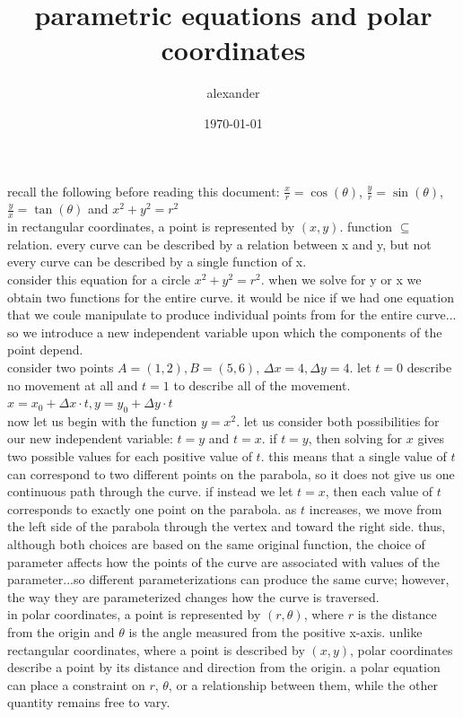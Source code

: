\documentclass{article}
\author{alexander}
\date{\today}
\title{parametric equations and polar coordinates}
\begin{document}
\maketitle



recall the following before reading this document: $\frac{x}{r} = \cos(\theta)$, $\frac{y}{r} = \sin(\theta)$, $\frac{y}{x} = \tan(\theta)$ and $x^2 + y^2 = r^2$\\

in rectangular coordinates, a point is represented by $(x, y)$. function $\subseteq$ relation. every curve can be described by a relation between x and y, but not every curve can be described by a single function of x.\\

consider this equation for a circle $x^2 + y^2 = r^2$. when we solve for y or x we obtain two functions for the entire curve. it would be nice if we had one equation that we coule manipulate to produce individual points from for the entire curve... so we introduce a new independent variable upon which the components of the point depend.\\

consider two points $A = (1, 2), B = (5, 6)$, $\Delta x = 4, \Delta y = 4$. let $t=0$ describe no movement at all and $t=1$ to describe all of the movement. $x = x_0 + \Delta x \cdot t, y = y_0 + \Delta y \cdot t$\\

now let us begin with the function $y = x^2$. let us consider both possibilities for our new independent variable: $t = y$ and $t = x$. if $t = y$, then solving for $x$ gives two possible values for each positive value of $t$. this means that a single value of $t$ can correspond to two different points on the parabola, so it does not give us one continuous path through the curve. if instead we let $t = x$, then each value of $t$ corresponds to exactly one point on the parabola. as $t$ increases, we move from the left side of the parabola through the vertex and toward the right side. thus, although both choices are based on the same original function, the choice of parameter affects how the points of the curve are associated with values of the parameter...so different parameterizations can produce the same curve; however, the way they are parameterized changes how the curve is traversed.\\

in polar coordinates, a point is represented by $(r,\theta)$, where $r$ is the distance from the origin and $\theta$ is the angle measured from the positive x-axis. unlike rectangular coordinates, where a point is described by $(x,y)$, polar coordinates describe a point by its distance and direction from the origin. a polar equation can place a constraint on $r$, $\theta$, or a relationship between them, while the other quantity remains free to vary.\\
\end{document}
